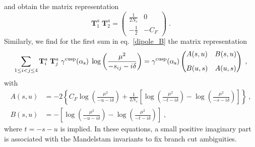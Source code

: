 and obtain the matrix representation
\begin{equation}
\mathbf{T}^a_1 \; \mathbf{T}^a_2 = \begin{pmatrix}
\frac{1}{2N_c} & 0 \\
-\frac{1}{2} & -C_F 
\end{pmatrix} \; .
\end{equation}
Similarly, we find for the first sum in eq.~\eqref{dipole_B} the matrix representation
\begin{equation}\label{dipole_matrix_form_B}
  \sum_{1\leq i <  j \leq 4} \mathbf{T}^a_i \; \mathbf{T}^a_j
  \; \gamma^\text{cusp}(\alpha_\mathrm{s})\;  \log\left(\frac{\mu^2}{-s_{ij}-i\delta}\right) = \gamma^\text{cusp} (\alpha_\mathrm{s}) \begin{pmatrix}
A(s,u) & B(s,u) \\[8pt]
B(u,s) & A(u,s)
\end{pmatrix} \; ,
\end{equation}  
with 
\begin{align}
A(s,u)&=-2\left\{C_F \log\left(\frac{\mu^2}{-u-i\delta}\right)+\frac{1}{2N_c}\left[ \log\left(\frac{\mu^2}{-t-i\delta}\right) - \log\left(\frac{\mu^2}{-s-i\delta}\right) \right] \right\} \: , \label{A_B}\\[10pt]
B(s,u)&= -\left[ \log\left(\frac{\mu^2}{-u-i\delta}\right) - \log\left(\frac{\mu^2}{-t-i\delta}\right) \right] \; , \label{ref1_end}
\end{align}
where $t=-s-u$ is implied.
In these equations, a small positive imaginary part is associated with the Mandelstam invariants to fix branch cut ambiguities.

